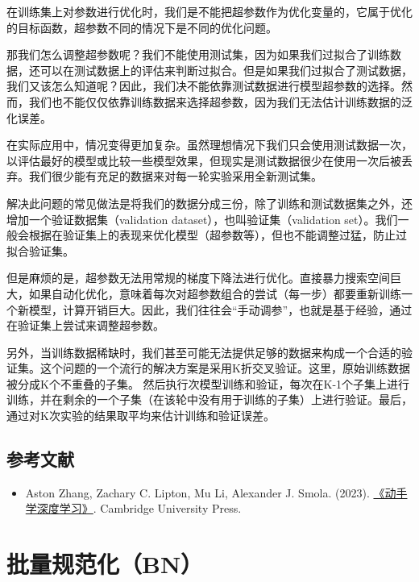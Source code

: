在训练集上对参数进行优化时，我们是不能把超参数作为优化变量的，它属于优化的目标函数，超参数不同的情况下是不同的优化问题。

那我们怎么调整超参数呢？我们不能使用测试集，因为如果我们过拟合了训练数据，还可以在测试数据上的评估来判断过拟合。但是如果我们过拟合了测试数据，我们又该怎么知道呢？因此，我们决不能依靠测试数据进行模型超参数的选择。然而，我们也不能仅仅依靠训练数据来选择超参数，因为我们无法估计训练数据的泛化误差。

在实际应用中，情况变得更加复杂。虽然理想情况下我们只会使用测试数据一次，以评估最好的模型或比较一些模型效果，但现实是测试数据很少在使用一次后被丢弃。我们很少能有充足的数据来对每一轮实验采用全新测试集。

解决此问题的常见做法是将我们的数据分成三份，除了训练和测试数据集之外，还增加一个验证数据集（validation dataset），也叫验证集（validation set）。我们一般会根据在验证集上的表现来优化模型（超参数等），但也不能调整过猛，防止过拟合验证集。

但是麻烦的是，超参数无法用常规的梯度下降法进行优化。直接暴力搜索空间巨大，如果自动化优化，意味着每次对超参数组合的尝试（每一步）都要重新训练一个新模型，计算开销巨大。因此，我们往往会``手动调参''，也就是基于经验，通过在验证集上尝试来调整超参数。

另外，当训练数据稀缺时，我们甚至可能无法提供足够的数据来构成一个合适的验证集。这个问题的一个流行的解决方案是采用K折交叉验证。这里，原始训练数据被分成K个不重叠的子集。 然后执行次模型训练和验证，每次在K-1个子集上进行训练，并在剩余的一个子集（在该轮中没有用于训练的子集）上进行验证。最后，通过对K次实验的结果取平均来估计训练和验证误差。

\hypertarget{ux53c2ux8003ux6587ux732e-5}{%
\subsection{参考文献}\label{ux53c2ux8003ux6587ux732e-5}}

\begin{itemize}
\tightlist
\item
  Aston Zhang, Zachary C. Lipton, Mu Li, Alexander J. Smola. (2023). \href{https://zh.d2l.ai/}{《动手学深度学习》}. Cambridge University Press.
\end{itemize}

\clearpage

\hypertarget{ux6279ux91cfux89c4ux8303ux5316bn}{%
\section{批量规范化（BN）}\label{ux6279ux91cfux89c4ux8303ux5316bn}}

